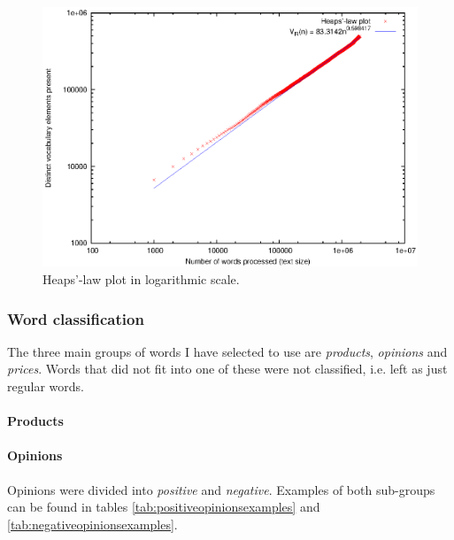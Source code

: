       \begin{figure}[H]
        \centering
        \includegraphics[width=\textwidth]{chapters/03_implementation/extraction_log}
        \caption{Heaps'-law plot in logarithmic scale.}
        \label{fig:word_extraction_log}
      \end{figure}


    \subsubsection{Word classification}
    
      The three main groups of words I have selected to use are \emph{products}, \emph{opinions} and \emph{prices}. Words that did not fit into one of these were not classified, i.e. left as just regular words.
    
      \paragraph{Products}
      
      \paragraph{Opinions}
      
        Opinions were divided into \emph{positive} and \emph{negative}. Examples of both sub-groups can be found in tables \ref{tab:positiveopinionsexamples} and \ref{tab:negativeopinionsexamples}.
        
